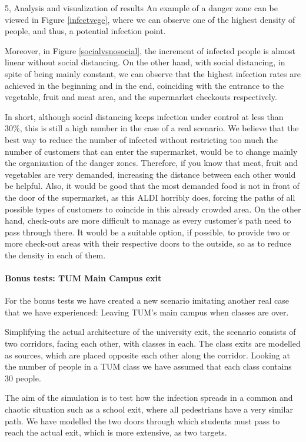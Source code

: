 \begin{task}{5, Analysis and visualization of results}
An example of a danger zone can be viewed in Figure \ref{infectvege}, where we can observe one of the highest density of people, and thus, a potential infection point. 

Moreover, in Figure \ref{socialvsnosocial}, the increment of infected people is almost linear without social distancing. On the other hand, with social distancing, in spite of being mainly constant, we can observe that the highest infection rates are achieved in the beginning and in the end, coinciding with the entrance to the vegetable, fruit and meat area, and the supermarket checkouts respectively.

In short, although social distancing keeps infection under control at less than 30\%, this is still a high number in the case of a real scenario. We believe that the best way to reduce the number of infected without restricting too much the number of customers that can enter the supermarket, would be to change mainly the organization of the danger zones. Therefore, if you know that meat, fruit and vegetables are very demanded, increasing the distance between each other would be helpful. Also, it would be good that the most demanded food is not in front of the door of the supermarket, as this ALDI horribly does, forcing the paths of all possible types of customers to coincide in this already crowded area. On the other hand, check-outs are more difficult to manage as every customer's path need to pass through there. It would be a suitable option, if possible, to provide two or more check-out areas with their respective doors to the outside, so as to reduce the density in each of them.

\paragraph{Bonus tests: TUM Main Campus exit}
For the bonus tests we have created a new scenario imitating another real case that we have experienced: Leaving TUM's main campus when classes are over.

Simplifying the actual architecture of the university exit, the scenario consists of two corridors, facing each other, with classes in each. The class exits are modelled as sources, which are placed opposite each other along the corridor. Looking at the number of people in a TUM class we have assumed that each class contains 30 people.

The aim of the simulation is to test how the infection spreads in a common and chaotic situation such as a school exit, where all pedestrians have a very similar path. We have modelled the two doors through which students must pass to reach the actual exit, which is more extensive, as two targets. 


\end{task}
